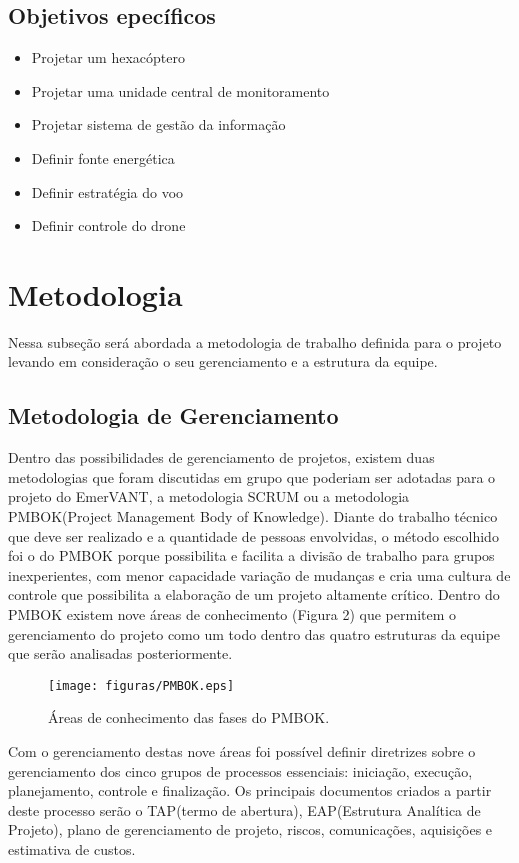 \subsection{Objetivos epecíficos}
\begin{itemize}
  \item Projetar um hexacóptero
  \item Projetar uma unidade central de monitoramento
	\item Projetar sistema de gestão da informação
	\item Definir fonte energética
	\item Definir estratégia do voo
	\item Definir controle do drone
\end{itemize}

\section{Metodologia}
Nessa subseção será abordada a metodologia de trabalho definida para o projeto levando em consideração o seu gerenciamento e a estrutura da equipe.
\subsection{Metodologia de Gerenciamento}

Dentro das possibilidades de gerenciamento de projetos, existem duas metodologias que foram discutidas em grupo que poderiam ser adotadas para o projeto do EmerVANT, a metodologia SCRUM ou a metodologia PMBOK(Project Management Body of Knowledge). Diante do trabalho técnico que deve ser realizado e a quantidade de pessoas envolvidas, o método escolhido foi o do PMBOK porque possibilita e facilita a divisão de trabalho para grupos inexperientes, com menor capacidade variação de mudanças e cria uma cultura de controle que possibilita a elaboração de um projeto altamente crítico. Dentro do PMBOK existem nove áreas de conhecimento (Figura 2) que permitem o gerenciamento do projeto como um todo dentro das quatro estruturas da equipe que serão analisadas posteriormente.

 \begin{figure}[ht]
	\centering
		\texttt{[image: figuras/PMBOK.eps]}
	\caption{Áreas de conhecimento das fases do PMBOK.}
\end{figure}

Com o gerenciamento destas nove áreas foi possível definir diretrizes sobre o gerenciamento dos cinco grupos de processos essenciais: iniciação, execução, planejamento, controle e finalização. Os principais documentos criados a partir deste processo serão o TAP(termo de abertura), EAP(Estrutura Analítica de Projeto), plano de gerenciamento de projeto, riscos, comunicações, aquisições e estimativa de custos.

